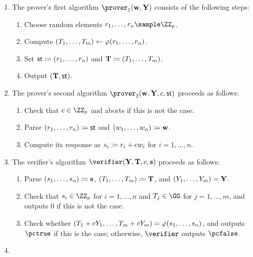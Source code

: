 \documentclass[runningheads,11pt]{article}
\begin{document}
\begin{enumerate}
  \item\label{item:basic:p1}
    The prover's first algorithm $\prover_1(\vec \witness,\vec \statement)$ consists of the following steps:
    \begin{enumerate}
      \item\label{item:basic:p1:randomness}
        Choose random elements $r_1,\dots,r_n\sample\ZZ_p$.
      \item
        Compute $(T_1,\dots,T_m)\gets\varphi(r_1,\dots,r_n)$.
      \item Set $\mathsf{st}\coloneqq (r_1,\dots,r_n)$ and $\mathbf {T}\coloneqq(T_1,\dots,T_m)$.
      \item
        Output $(\mathbf {T},\mathsf{st})$.
    \end{enumerate}
  \item\label{item:basic:p2}
    The prover's second algorithm $\prover_2(\vec \witness,\vec Y ,\challenge,\st)$ proceeds as follows:
    \begin{enumerate}
      \item
        Check that $\challenge\in\ZZ_p$ and aborts if this is not the case.
      \item Parse $(r_1,\dots,r_n)\coloneqq \mathsf{st}$ and $(w_1,\dots,w_n)\coloneqq \mathbf {w}$.
      \item Compute its response as $s_i\coloneqq r_i+cw_i$ for $i=1,\dots,n$.
    \end{enumerate}
  \item\label{item:basic:v}
    The verifier's algorithm $\verifier(\vec \statement,\vec \commitment,\challenge,\vec \response)$ proceeds as follows:
    \begin{enumerate}
      \item Parse $(s_1, \dots, s_n) \coloneqq \mathbf {s}$, $(T_1, \dots, T_m) \coloneqq \mathbf {T}$, and $(Y_1, \dots, Y_m) = \mathbf {Y}$.
      \item\label{item:basic:v:checks}
        Check that $\response_i\in\ZZ_p$ for $i=1,\dots,n$ and $\commitment_j\in\GG$ for $j=1,\dots,m$, and outputs $0$ if this is not the case.
      \item Check whether $(T_1 + cY_1,\dots,T_m + cY_m) = \varphi(s_1,\dots,s_n)$, and outputs $\accept$ if this is the case; otherwise, $\verifier$ outputs $\reject$.
    \end{enumerate}
  \item\label{item:basic:sim}

\end{enumerate}
\end{document}
